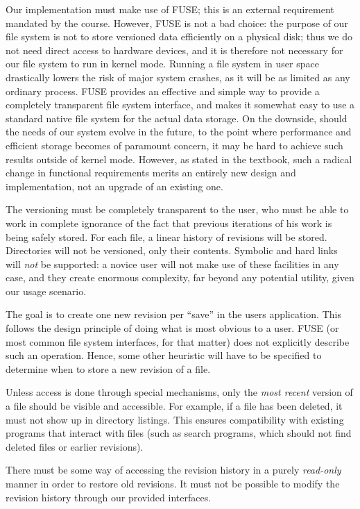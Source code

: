 \documentclass[12pt]{article}
\begin{document}
Our implementation must make use of FUSE; this is an external
requirement mandated by the course.  However, FUSE is not a bad
choice: the purpose of our file system is not to store versioned data
efficiently on a physical disk; thus we do not need direct access to
hardware devices, and it is therefore not necessary for our file
system to run in kernel mode.  Running a file system in user space
drastically lowers the risk of major system crashes, as it will be as
limited as any ordinary process\cite{EGGERT:1993mz}.  FUSE provides an
effective and simple way to provide a completely transparent file
system interface, and makes it somewhat easy to use a standard native
file system for the actual data storage.  On the downside, should the
needs of our system evolve in the future, to the point where
performance and efficient storage becomes of paramount concern, it may
be hard to achieve such results outside of kernel mode.  However, as
stated in the textbook, such a radical change in functional
requirements merits an entirely new design and implementation, not an
upgrade of an existing one.

The versioning must be completely transparent to the user, who must be
able to work in complete ignorance of the fact that previous
iterations of his work is being safely stored.  For each file, a
linear history of revisions will be stored.  Directories will not be
versioned, only their contents.  Symbolic and hard links will
\textit{not} be supported: a novice user will not make use of these
facilities in any case, and they create enormous complexity, far
beyond any potential utility, given our usage scenario.

The goal is to create one new revision per ``save'' in the users
application.  This follows the design principle of doing what is most
obvious to a user.  FUSE (or most common file system interfaces, for
that matter) does not explicitly describe such an operation.  Hence,
some other heuristic will have to be specified to determine when to
store a new revision of a file.

Unless access is done through special mechanisms, only the
\textit{most recent} version of a file should be visible and
accessible.  For example, if a file has been deleted, it must not show
up in directory listings.  This ensures compatibility with existing
programs that interact with files (such as search programs, which
should not find deleted files or earlier revisions).

There must be some way of accessing the revision history in a purely
\textit{read-only} manner in order to restore old revisions.  It must
not be possible to modify the revision history through our provided
interfaces.
 
\end{document}
